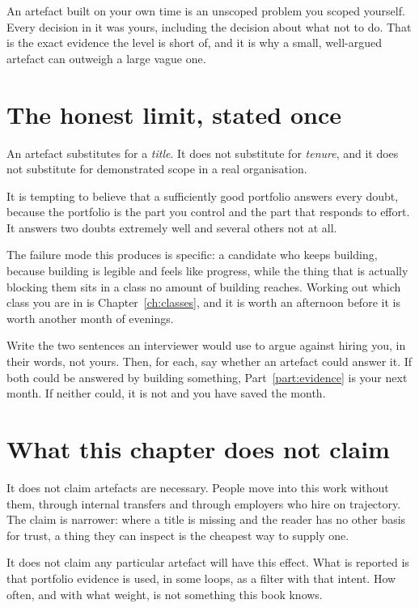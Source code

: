 An artefact built on your own time is an unscoped problem you scoped yourself.
Every decision in it was yours, including the decision about what not to do.
That is the exact evidence the level is short of, and it is why a small,
well-argued artefact can outweigh a large vague one.

\section{The honest limit, stated once}

An artefact substitutes for a \emph{title}. It does not substitute for
\emph{tenure}, and it does not substitute for demonstrated scope in a real
organisation.

\begin{kittrap}
It is tempting to believe that a sufficiently good portfolio answers every
doubt, because the portfolio is the part you control and the part that responds
to effort. It answers two doubts extremely well and several others not at all.

The failure mode this produces is specific: a candidate who keeps building,
because building is legible and feels like progress, while the thing that is
actually blocking them sits in a class no amount of building reaches. Working
out which class you are in is Chapter~\ref{ch:classes}, and it is worth an
afternoon before it is worth another month of evenings.
\end{kittrap}

\begin{drill}
Write the two sentences an interviewer would use to argue against hiring you,
in their words, not yours. Then, for each, say whether an artefact could answer
it. If both could be answered by building something, Part~\ref{part:evidence}
is your next month. If neither could, it is not \dash{} and you have saved the
month.
\end{drill}

\section*{What this chapter does not claim}

It does not claim artefacts are necessary. People move into this work without
them, through internal transfers and through employers who hire on trajectory.
The claim is narrower: where a title is missing and the reader has no other
basis for trust, a thing they can inspect is the cheapest way to supply one.

It does not claim any particular artefact will have this effect. What is
reported is that portfolio evidence is used, in some loops, as a filter with
that intent. How often, and with what weight, is not something this book knows.

